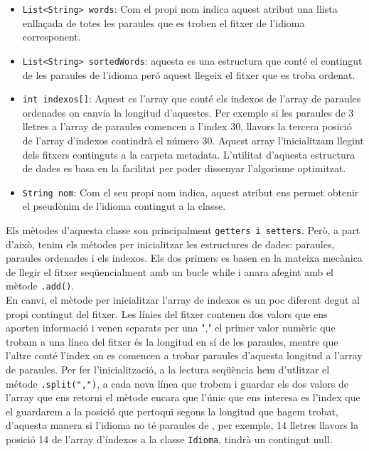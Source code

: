 \documentclass[conference]{IEEEtran}
\begin{document}
    \begin{itemize}
        \item \texttt{List<String> words}: Com el propi nom indica aquest atribut una llista enllaçada de totes les paraules que es troben el fitxer de l'idioma corresponent.
        \item \texttt{List<String> sortedWords}: aquesta es una estructura que conté el contingut de les paraules de l'idioma peró aquest llegeix el fitxer que es troba ordenat.
        \item \texttt{int indexos[]}: Aquest es l'array que conté els indexos de l'array de paraules ordenades on canvia la longitud d'aquestes. Per exemple si les paraules de 3 lletres a l'array de paraules comencen a l'index 30, llavors la tercera posició de l'array d'indexos contindrà el número 30. Aquest array l'inicialitzam llegint dels fitxers continguts a la carpeta metadata. L'utilitat d'aquesta estructura de dades es basa en la facilitat per poder dissenyar l'algorisme optimitzat.
        \item \texttt{String nom}: Com el seu propi nom indica, aquest atribut ens permet obtenir el pseudònim de l'idioma contingut a la classe.


    \end{itemize}
Els mètodes d'aquesta classe son principalment \texttt{getters i setters}. Però, a part d'això, tenim els métodes per inicialitzar les estructures de dades: paraules, paraules ordenades i els indexos.
Els dos primers es basen en la mateixa mecànica de llegir el fitxer seqüencialment amb un bucle while i anara afegint amb el mètode \texttt{.add()}.\\
En canvi, el mètode per inicialitzar l'array de indexos es un poc diferent degut al propi contingut del fitxer. Les línies del fitxer contenen dos valors que ens aporten informació i venen separats per una "," el primer valor numèric que trobam a una línea del fitxer és la longitud en sí de les paraules, mentre que l'altre conté l'index on es comencen a trobar paraules d'aquesta longitud a l'array de paraules. Per fer l'inicialització, a la lectura seqüència hem d'utlitzar el métode \texttt{.split(",")}, a cada nova línea que trobem i guardar els dos valors de l'array que ens retorni el mètode encara que l'únic que ens interesa es l'index que el guardarem a la posició que pertoqui segons la longitud que hagem trobat, d'aquesta manera si l'idioma no té paraules de , per exemple, 14 lletres llavors la posició 14 de l'array d'índexos a la classe \texttt{Idioma}, tindrà un contingut null.
\end{document}
